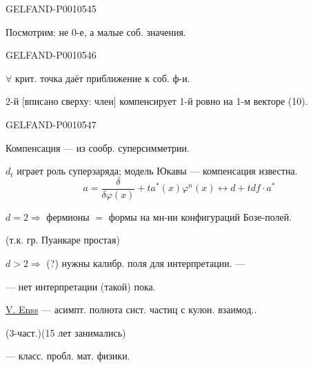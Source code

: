 \begin{GelfandAdjacentEvidence}{GELFAND-P001054}{5}

Посмотрим: не $0$-е, а малые соб. значения.
\end{GelfandAdjacentEvidence}
\begin{GelfandAdjacentEvidence}{GELFAND-P001054}{6}


$\forall$ крит. точка даёт приближение к соб. ф-и.

2-й [вписано сверху: член]
компенсирует 1-й ровно на 1-м векторе (10).
\end{GelfandAdjacentEvidence}
\begin{GelfandAdjacentEvidence}{GELFAND-P001054}{7}


Компенсация — из сообр. суперсимметрии.

$d_t$ играет роль суперзаряда; модель Юкавы — компенсация известна.
\begin{equation*}
a=\frac{\delta}{\delta\varphi(x)}+ta^*(x)\varphi^n(x)
\leftrightarrow d+tdf\cdot a^*
\tag{11}
\end{equation*}
\end{GelfandAdjacentEvidence}


\underline{$d=2$}$\Rightarrow$ фермионы $=$ формы на мн-ии конфигураций Бозе-полей.

(т.к. гр. Пуанкаре простая)

\underline{$d>2$}$\Rightarrow$ (?) нужны калибр. поля для интерпретации. —

— нет интерпретации (такой) пока.

\underline{V. Enss} — асимпт. полнота сист. частиц с кулон. взаимод..

(3-част.)\qquad (15 лет занимались)

— класс. пробл. мат. физики.


